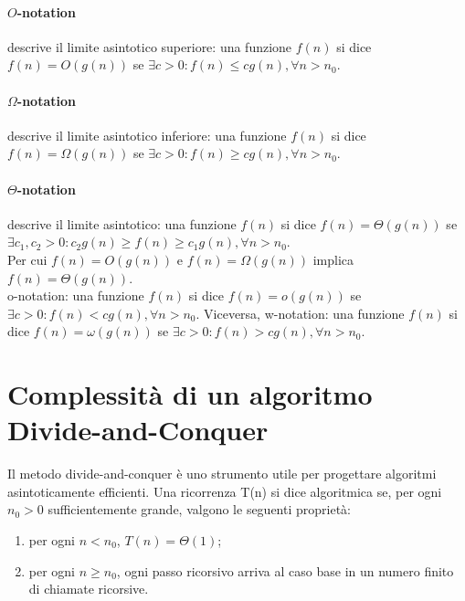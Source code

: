 \documentclass{article}
\begin{document}
\paragraph{$O$-notation} descrive il limite asintotico superiore: una funzione
$f(n)$ si dice $f(n)= O(g(n))$ se $\exists c>0:f(n) \leq cg(n), \forall n>n_0$.

\paragraph{$\Omega$-notation} descrive il limite asintotico inferiore: una funzione
$f(n)$ si dice $f(n)= \Omega(g(n))$ se $\exists c>0:f(n) \geq cg(n), \forall n>n_0$.

\paragraph{$\Theta$-notation} descrive il limite asintotico: una funzione
$f(n)$ si dice $f(n)= \Theta(g(n))$ se $\exists c_1, c_2 > 0:c_2g(n) \geq f(n)
	\geq c_1g(n), \forall n>n_0$.\\

Per cui $f(n)=O(g(n))$ e $f(n)=\Omega(g(n))$ implica $f(n)=\Theta(g(n))$.\\
o-notation: una funzione $f(n)$ si dice $f(n)= o(g(n))$ se $\exists c>0: f(n) <
	cg(n), \forall n>n_0$. Viceversa, w-notation: una funzione $f(n)$ si dice $f(n)
	=\omega(g(n))$ se $\exists c>0: f(n) > cg(n), \forall n>n_0$.

\section{Complessità di un algoritmo Divide-and-Conquer}
Il metodo divide-and-conquer è uno strumento utile per progettare algoritmi
asintoticamente efficienti. Una ricorrenza T(n) si dice algoritmica se, per ogni
$n_0>0$ sufficientemente grande, valgono le seguenti proprietà:
\begin{enumerate}
	\item per ogni $n<n_0$, $T(n)=\Theta(1)$;
	\item per ogni $n\geq n_0$, ogni passo ricorsivo arriva al caso base in un
	      numero finito di chiamate ricorsive.
\end{enumerate}
\end{document}
